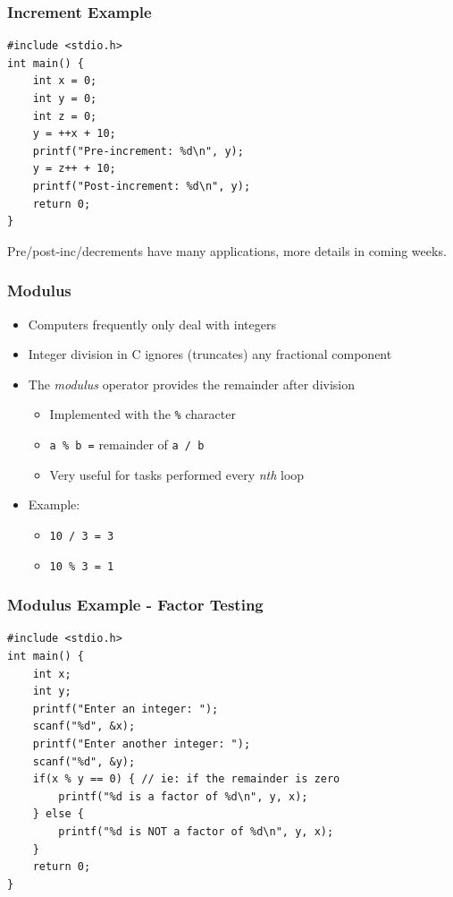 \documentclass[14pt]{beamer}
\begin{document}
\begin{frame}[fragile]
\frametitle{Increment Example}
\begin{lstlisting}[style=CStyle]
#include <stdio.h>
int main() {
	int x = 0;
	int y = 0;
	int z = 0;
	y = ++x + 10;
	printf("Pre-increment: %d\n", y);
	y = z++ + 10;
	printf("Post-increment: %d\n", y);
	return 0;
}
\end{lstlisting}
Pre/post-inc/decrements have many applications, more details in coming weeks.
\end{frame}

\begin{frame}
\frametitle{Modulus}
\begin{itemize}
\item Computers frequently only deal with integers
\item Integer division in C ignores (truncates) any fractional component
\item The \textit{modulus} operator provides the remainder after division
\begin{itemize}
	\item Implemented with the \texttt{\%} character
	\item \texttt{a \% b =} remainder of \texttt{a / b}
	\item Very useful for tasks performed every \textit{nth} loop
\end{itemize}
\item Example:
	\begin{itemize}	
		\item \texttt{10 / 3 = 3}
		\item \texttt{10 \% 3 = 1}
	\end{itemize}
\end{itemize}
\end{frame}

\begin{frame}[fragile]
\frametitle{Modulus Example - Factor Testing}
\begin{lstlisting}[style=CStyle]
#include <stdio.h>
int main() {
	int x;
	int y;
	printf("Enter an integer: ");
	scanf("%d", &x);
	printf("Enter another integer: ");
	scanf("%d", &y);
	if(x % y == 0) { // ie: if the remainder is zero
		printf("%d is a factor of %d\n", y, x);
	} else {
		printf("%d is NOT a factor of %d\n", y, x);
	}
	return 0;
}
\end{lstlisting}
\end{frame}
\end{document}
